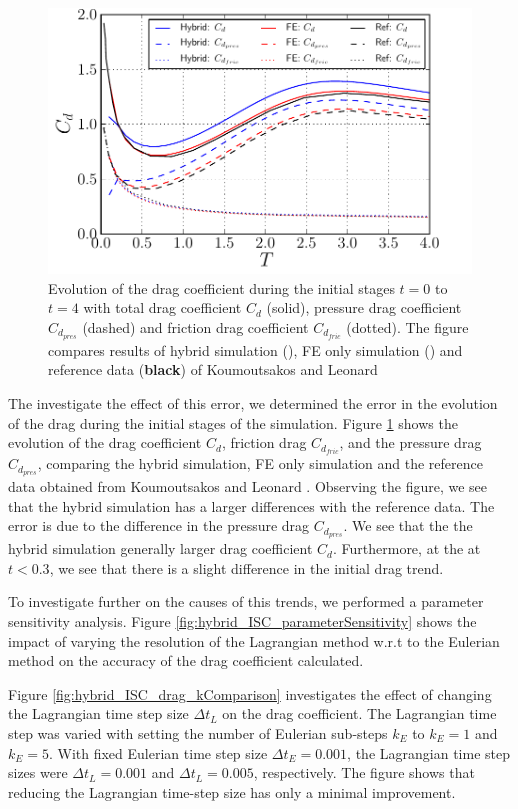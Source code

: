 	\begin{figure}[!p]
	\showthe\columnwidth
	\centering
	\includegraphics[width=0.6\linewidth]{./figures/hybrid/isc/hybrid_ISC_drag.pdf}
	\caption{ Evolution of the drag coefficient during the initial stages $t=0$ to $t=4$ with total drag coefficient $C_d$ (solid), pressure drag coefficient $C_{d_{pres}}$ (dashed) and friction drag coefficient $C_{d_{fric}}$ (dotted). The figure compares results of hybrid simulation ({}), FE only simulation ({}) and reference data (\textbf{black}) of Koumoutsakos and Leonard \cite{Koumoutsakos1995a}}
	\label{fig:hybrid_ISC_drag}
	\end{figure}

The investigate the effect of this error, we determined the error in the evolution of the drag during the initial stages of the simulation. Figure \ref{fig:hybrid_ISC_drag} shows the evolution of the drag coefficient $C_d$, friction drag $C_{d_{fric}}$, and the pressure drag $C_{d_{pres}}$, comparing the hybrid simulation, FE only simulation and the reference data obtained from Koumoutsakos and Leonard \cite{Koumoutsakos1995a}. Observing the figure, we see that the hybrid simulation has a larger differences with the reference data. The error is due to the difference in the pressure drag $C_{d_{pres}}$. We see that the the hybrid simulation generally larger drag coefficient $C_d$. Furthermore, at the at $t<0.3$, we see that there is a slight difference in the initial drag trend.  

To investigate further on the causes of this trends, we performed a parameter sensitivity analysis. Figure \ref{fig:hybrid_ISC_parameterSensitivity} shows the impact of varying the resolution of the Lagrangian method w.r.t to the Eulerian method on the accuracy of the drag coefficient calculated.

Figure \ref{fig:hybrid_ISC_drag_kComparison} investigates the effect of changing the Lagrangian time step size $\Delta t_L$ on the drag coefficient. The Lagrangian time step was varied with setting the number of Eulerian sub-steps $k_E$ to $k_E=1$ and $k_E=5$. With fixed Eulerian time step size $\Delta t_E=0.001$, the Lagrangian time step sizes were $\Delta t_L = 0.001$ and $\Delta t_L=0.005$, respectively. The figure shows that reducing the Lagrangian time-step size has only a minimal improvement.

